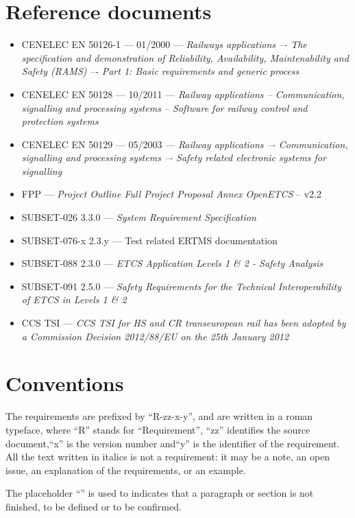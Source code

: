 \documentclass{template/openetcs_article}
\begin{document}
\section{Reference documents}
\begin{itemize}
\item CENELEC EN 50126-1 --- 01/2000 --- \emph{Railways applications –- The specification and 
demonstration of Reliability, Availability, Maintenability and Safety (RAMS) –- Part 1: 
Basic requirements and generic process}
\item CENELEC EN 50128 --- 10/2011 --- \emph{Railway applications -- Communication, signalling and 
processing systems -- Software for railway control and protection systems}
\item CENELEC EN 50129 --- 05/2003 --- \emph{Railway applications –- Communication, signalling and 
processing systems –- Safety related electronic systems for signalling}
\item FPP --- \emph{Project Outline Full Project Proposal Annex OpenETCS} -- v2.2
\item SUBSET-026 3.3.0 --- \emph{System Requirement Specification}
\item SUBSET-076-x 2.3.y --- Test related ERTMS documentation
\item SUBSET-088 2.3.0 --- \emph{ETCS Application Levels 1 \& 2 - Safety Analysis}
\item SUBSET-091 2.5.0 --- \emph{Safety Requirements for the Technical Interoperability
of ETCS in Levels 1 \& 2}
\item CCS TSI --- \emph{ CCS TSI for HS and CR transeuropean rail has been adopted by a Commission Decision 2012/88/EU on the 25th January 2012}
\end{itemize}

\section{Conventions}
The requirements are prefixed by “R-zz-x-y”, and are written in a roman typeface, where ``R'' 
stands for ``Requirement'', ``zz'' identifies the source document,``x'' 
is the version number and``y'' is the identifier of the requirement. All the text 
written in italics is not a requirement: it may be a note, an open issue, an 
explanation of the requirements, or an example.

The placeholder “” is used to indicates that a paragraph or section is not finished, 
to be defined or to be confirmed.
\end{document}
